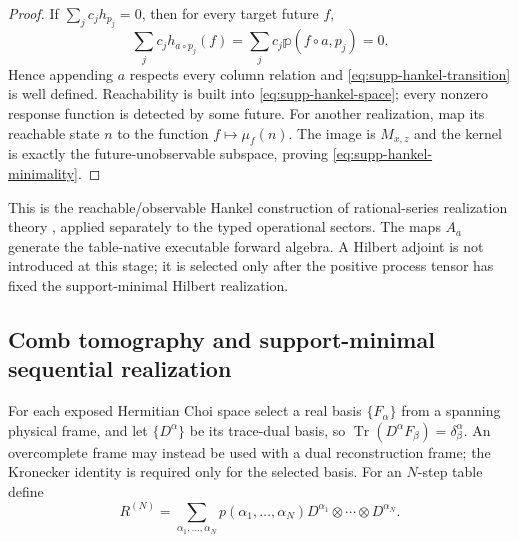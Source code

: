 \documentclass[11pt]{article}
\numberwithin{equation}{section}
\theoremstyle{definition}
\theoremstyle{remark}
\newcommand{\Tr}{\operatorname{Tr}}
\begin{document}
\begin{proof}
If $\sum_jc_jh_{p_j}=0$, then for every target future $f$,
\[
 \sum_jc_jh_{a\circ p_j}(f)
 =\sum_jc_j\mathbb p(f\circ a,p_j)=0.
\]
Hence appending $a$ respects every column relation and
\eqref{eq:supp-hankel-transition} is well defined.  Reachability is built into
\eqref{eq:supp-hankel-space}; every nonzero response function is detected by
some future.  For another realization, map its reachable state $n$ to the
function $f\mapsto\mu_f(n)$.  The image is $M_{x,z}$ and the kernel is exactly
the future-unobservable subspace, proving
\eqref{eq:supp-hankel-minimality}.
\end{proof}

This is the reachable/observable Hankel construction of rational-series
realization theory \cite{BerstelReutenauer}, applied separately to the typed
operational sectors. The maps $A_a$ generate the table-native executable forward algebra.  A
Hilbert adjoint is not introduced at this stage; it is selected only after the
positive process tensor has fixed the support-minimal Hilbert realization.

\subsection{Comb tomography and support-minimal sequential realization}

For each exposed Hermitian Choi space select a real basis
$\{F_\alpha\}$ from a spanning physical frame, and let $\{D^\alpha\}$ be
its trace-dual basis, so $\Tr(D^\alpha F_\beta)=\delta^\alpha_\beta$.
An overcomplete frame may instead be used with a dual reconstruction frame;
the Kronecker identity is required only for the selected basis.  For an $N$-step table define
\begin{equation}
 R^{(N)}
 =\sum_{\alpha_1,\ldots,\alpha_N}
 p(\alpha_1,\ldots,\alpha_N)
 D^{\alpha_1}\otimes\cdots\otimes D^{\alpha_N}.
 \label{eq:supp-comb-tomography}
\end{equation}
\end{document}
